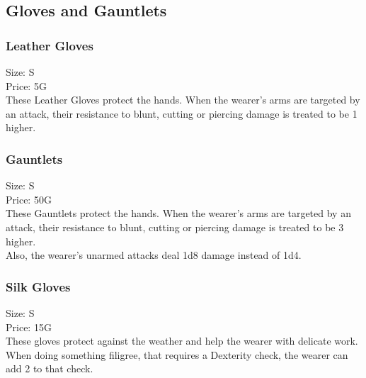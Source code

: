 \subsection{Gloves and Gauntlets}

\subsubsection{Leather Gloves}
Size: S\\
Price: 5G\\
These Leather Gloves protect the hands. When the wearer's arms are targeted by an attack, their resistance to blunt, cutting or piercing damage is treated to be 1 higher.

\subsubsection{Gauntlets}
Size: S\\
Price: 50G\\
These Gauntlets protect the hands. When the wearer's arms are targeted by an attack, their resistance to blunt, cutting or piercing damage is treated to be 3 higher.\\
Also, the wearer's unarmed attacks deal 1d8 damage instead of 1d4.

\subsubsection{Silk Gloves}
Size: S\\
Price: 15G\\
These gloves protect against the weather and help the wearer with delicate work. When doing something filigree, that requires a Dexterity check, the wearer can add 2 to that check.